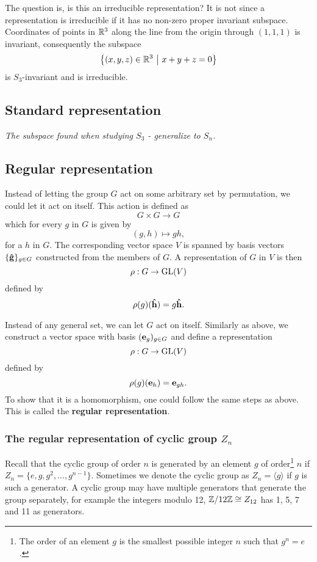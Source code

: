 	The question is, is this an irreducible representation? It is not since a representation is irreducible if it has no non-zero proper invariant subspace. Coordinates of points in $\mathbb{R}^3$ along the line from the origin through $(1,1,1)$ is invariant, consequently the subspace $$\left\{ (x,y,z) \in \mathbb{R}^3 \ \middle\vert \ x+y+z=0 \right\}$$ is $S_3$-invariant and is irreducible.

\subsection{Standard representation}

	\textit{The subspace found when studying $S_3$ - generalize to $S_n$.}

\subsection{Regular representation}

	Instead of letting the group $G$ act on some arbitrary set by permutation, we could let it act on itself. This action is defined as
	\[
	G \times G \rightarrow G
	\]
	which for every $g$ in $G$ is given by 
	\[
	(g,h) \mapsto gh,
	\]
	for a $h$ in $G$. The corresponding vector space $V$ is spanned by basis vectors $\{\mathbf{\hat{g}}\}_{g \in G}$ constructed from the members of $G$. A representation of $G$ in $V$ is then
	\[
	\rho: G \rightarrow \text{GL}(V)
	\]
	defined by
	\[
	\rho(g)(\mathbf{\hat{h}}) = g\mathbf{\hat{h}}.
	\]
	
	Instead of any general set, we can let $G$ act on itself. Similarly as above, we construct a vector space with basis $( \mathbf{e}_g )_{g \in G}$ and define a representation
	\[
	\rho: G \rightarrow \text{GL}(V)
	\]
	defined by
	\[
	\rho(g)(\mathbf{e}_h) = \mathbf{e}_{gh}.
	\]
	To show that it is a homomorphism, one could follow the same steps as above. This is called the \textbf{regular representation}.
	
	\subsubsection{The regular representation of cyclic group $Z_n$}
	
		Recall that the cyclic group of order $n$ is generated by an element $g$ of order\footnote{The order of an element $g$ is the smallest possible integer $n$ such that $g^n = e$.} $n$ if $Z_n = \{e, g, g^2, \dots, g^{n-1} \}$. Sometimes we denote the cyclic group as $Z_n = \langle g \rangle$ if $g$ is such a generator. A cyclic group may have multiple generators that generate the group separately, for example the integers modulo 12, $\mathbb{Z}/12\mathbb{Z} \cong Z_{12}$ has 1, 5, 7 and 11 as generators. 
		
